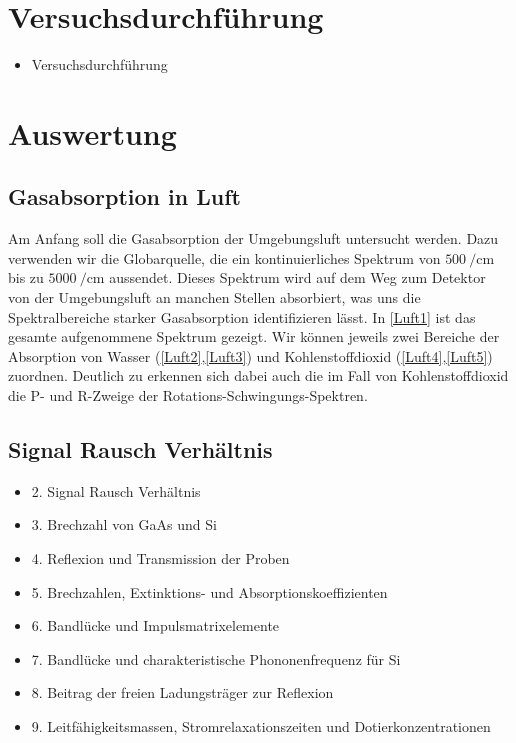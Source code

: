 \documentclass[paper=a4,fontsize=10pt,DIV=18,twocolumn,parskip=half]{scrartcl}
\numberwithin{equation}{section}    %
\begin{document}

\section{Versuchsdurchführung}
\begin{itemize}
\item Versuchsdurchführung
\end{itemize}


\section{Auswertung}

\subsection{Gasabsorption in Luft}
Am Anfang soll die Gasabsorption der Umgebungsluft untersucht werden. 
Dazu verwenden wir die Globarquelle, die ein kontinuierliches Spektrum von $\SI{500}{\per\centi\meter}$ bis zu $\SI{5000}{\per\centi\meter}$ aussendet. 
Dieses Spektrum wird auf dem Weg zum Detektor von der Umgebungsluft an manchen Stellen absorbiert, was uns die Spektralbereiche starker Gasabsorption identifizieren lässt.
In \ref{Luft1} ist das gesamte aufgenommene Spektrum gezeigt. 
Wir können jeweils zwei Bereiche der Absorption von Wasser (\ref{Luft2},\ref{Luft3}) und Kohlenstoffdioxid (\ref{Luft4},\ref{Luft5}) zuordnen. 
Deutlich zu erkennen sich dabei auch die im Fall von Kohlenstoffdioxid die P- und R-Zweige der Rotations-Schwingungs-Spektren.

\subsection{Signal Rausch Verhältnis}

\begin{itemize}
\item 2. Signal Rausch Verhältnis
\item 3. Brechzahl von GaAs und Si
\item 4. Reflexion und Transmission der Proben
\item 5. Brechzahlen, Extinktions- und Absorptionskoeffizienten
\item 6. Bandlücke und Impulsmatrixelemente
\item 7. Bandlücke und charakteristische Phononenfrequenz für Si
\item 8. Beitrag der freien Ladungsträger zur Reflexion
\item 9. Leitfähigkeitsmassen, Stromrelaxationszeiten und Dotierkonzentrationen
\end{itemize}
\end{document}
